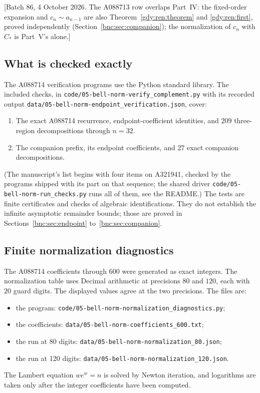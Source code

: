 \documentclass[11pt]{article}
\numberwithin{equation}{section}
\theoremstyle{definition}
\theoremstyle{remark}
\begin{document}
[Batch 86, 4 October 2026. The A088713 row overlaps Part~IV: the
fixed-order expansion and \(c_n\sim a_{n-1}\) are also
Theorem~\ref{gdy:ren:theorem} and \eqref{gdy:ren:first}, proved
independently (Section~\ref{bnc:sec:companion}); the normalization of
\(c_n\) with \(C_*\) is Part~V's alone.]

\subsection{What is checked exactly}

The A088714 verification programs use the Python standard library.
The included checks, in
\nolinkurl{code/05-bell-norm-verify_complement.py} with its recorded
output \nolinkurl{data/05-bell-norm-endpoint_verification.json}, cover:
\begin{enumerate}
\item The exact A088714 recurrence, endpoint-coefficient identities,
and \(209\) three-region decompositions through \(n=32\).
\item The companion prefix, its endpoint coefficients, and
\(27\) exact companion decompositions.
\end{enumerate}
(The manuscript's list begins with four items on A321941, checked by the
programs shipped with its part on that sequence; the shared driver
\nolinkurl{code/05-bell-norm-run_checks.py} runs all of them, see the
README.)
The tests are finite certificates and checks of algebraic
identifications.  They do not establish the infinite asymptotic
remainder bounds; those are proved in Sections~\ref{bnc:sec:endpoint}
to~\ref{bnc:sec:companion}.

\subsection{Finite normalization diagnostics}

The A088714 coefficients through \(600\) were generated as exact
integers.  The normalization table uses Decimal arithmetic at precisions
\(80\) and \(120\), each with \(20\) guard digits.
The displayed values agree at the two precisions. The files are:
\begin{itemize}[nosep]
\item the program: \nolinkurl{code/05-bell-norm-normalization_diagnostics.py};
\item the coefficients: \nolinkurl{data/05-bell-norm-coefficients_600.txt};
\item the run at 80 digits: \nolinkurl{data/05-bell-norm-normalization_80.json};
\item the run at 120 digits: \nolinkurl{data/05-bell-norm-normalization_120.json}.
\end{itemize}
The Lambert equation \(we^w=n\) is solved by Newton iteration,
and logarithms are taken only after the integer coefficients have
been computed.
\end{document}
